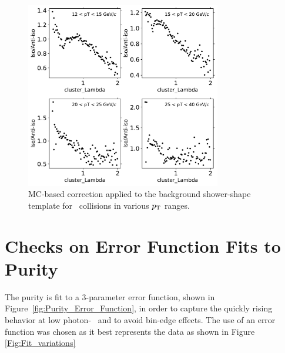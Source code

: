 \begin{figure}
	\center
	\includegraphics[width=0.76\textwidth]{Checks_Systematics/bkg-template-correction-p-Pb}
	\caption{MC-based correction applied to the background shower-shape template for \pPb~collisions in various $p_{\mathrm{T}}$ ranges.}
	\label{fig:bkgCorrection}
\end{figure}

\section{Checks on Error Function Fits to Purity}
The purity is fit to a 3-parameter error function, shown in Figure~\ref{fig:Purity_Error_Function}, in order to capture the quickly rising behavior at low photon-\pt~ and to avoid bin-edge effects. The use of an error function was chosen as it best represents the data as shown in Figure \ref{Fig:Fit_variations}

